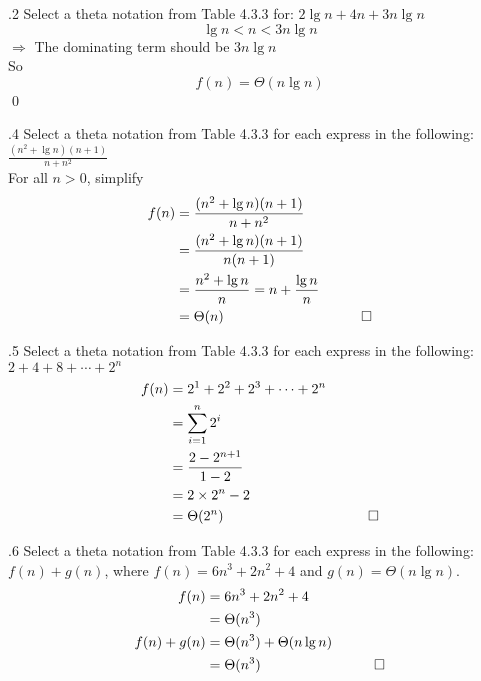 \documentclass[handout]{beamer}
\begin{document}
        \begin{frame}[c]{\subsecname.2}
            Select a theta notation from Table 4.3.3 for: $2\lg{n}+4n+3n\lg{n}$\\$\;$\\\pause
            \[\lg n<n<3n\lg n\]
            $\Rightarrow$ The dominating term should be $3n\lg{n}$\\
            So\[f(n)=\Theta(n\lg{n})\] \qed
        \end{frame}
    
        \begin{frame}[c]{\subsecname.4}
            Select a theta notation from Table 4.3.3 for each express in the following:$\frac{(n^2+\lg{n})(n+1)}{n+n^2}$\\$\;$\\\pause
            For all $n > 0$, simplify\\
            \begin{align*}
            f(n)&=\frac{(n^2+\lg{n})(n+1)}{n+n^2}\\
            &=\frac{(n^2+\lg{n})(n+1)}{n(n+1)}\\
            &=\frac{n^2+\lg{n}}{n}=n+\frac{\lg{n}}{n}\\
            &=\Theta(n) &\qed
            \end{align*}
        \end{frame}
    
        \begin{frame}[c]{\subsecname.5}
            Select a theta notation from Table 4.3.3 for each express in the following:$2+4+8+\cdots+2^n$\\\pause
            \begin{align*}
            f(n)&=2^1+2^2+2^3+\cdots+2^n\\
            &=\sum_{i=1}^{n}2^i\\
            &=\frac{2-2^{n+1}}{1-2}\\
            &=2\times2^n-2\\
            &=\Theta(2^n) &\qed
            \end{align*}
        \end{frame}
    
        \begin{frame}[c]{\subsecname.6}
            Select a theta notation from Table 4.3.3 for each express in the following:$f(n)+g(n)$, where $f(n)=6n^3+2n^2+4$ and $g(n)=\Theta(n\lg{n})$.\\\pause
            \begin{align*}
            f(n)&=6n^3+2n^2+4\\
            &=\Theta(n^3)\\
            f(n)+g(n)&=\Theta(n^3)+\Theta(n\lg{n})\\
            &=\Theta(n^3) &\qed
            \end{align*}
        \end{frame}
\end{document}
